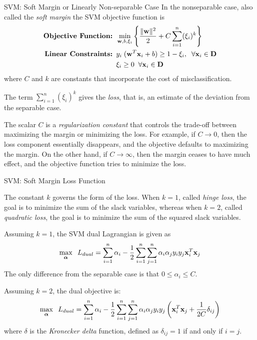 \begin{frame}{SVM: Soft Margin or Linearly Non-separable Case}
In the nonseparable case, also called the {\em soft margin}
the SVM objective function is
\begin{align*}
  \mbox{\bf Objective Function: } & \min_{\mathbf{w},b,\xi_i} \left\{ {\| \mathbf{w} \|^2 \over 2} + C
  \displaystyle \sum_{i=1}^n (\xi_i)^k \right \}\\
  \mbox{\bf Linear Constraints: } & y_i \; (\mathbf{w}^T\mathbf{x}_i + b) \ge 1 - \xi_i,\;\;
  \forall \mathbf{x}_i \in \mathbf{D}\\
  & \xi_i \ge 0 \; \; \forall \mathbf{x}_i \in \mathbf{D}
\end{align*}
where $C$
and $k$ are constants that incorporate the cost of
misclassif\/{i}cation.  

\medskip
The term $\sum_{i=1}^n (\xi_i)^k$ gives the
{\em loss}, that is, an estimate of the deviation from the
separable case. 

\medskip
The scalar $C$ is a {\em
regularization constant} that controls the trade-off between
maximizing the margin  or minimizing the loss.
For example, if $C \to 0$, then the loss component essentially
disappears, and the objective defaults to maximizing the margin.
On the other hand, if $C \to \infty$, then the margin ceases to
have much effect, and the objective function tries to minimize the
loss. 
\end{frame}


\begin{frame}{SVM: Soft Margin Loss Function}

The constant $k$ governs the form of the loss. When $k=1$, called {\em hinge loss}, the goal is
to minimize the sum of the slack variables, whereas when $k=2$,
called {\em quadratic loss}, the goal is to minimize the sum of
the squared slack variables.

Assuming $k=1$, the SVM dual Lagrangian is given as
\begin{align*}
     \max_{{\bm \alpha}}\;\;
     L_{dual} = \displaystyle \sum_{i=1}^n\alpha_{i} - {1 \over 2} \displaystyle \sum_{i=1}^n
  \displaystyle \sum_{j=1}^n \alpha_i\alpha_{j} y_i y_{j} \mathbf{x}_i^T\mathbf{x}_{j}
\end{align*}
The only difference from the separable case is that
$0 \le \alpha_i \le C$.

 Assuming $k=2$,
the dual objective is:
\begin{align*}
    \max_{{\bm \alpha}}\;\;
     L_{dual} = \displaystyle \sum_{i=1}^n\alpha_{i} - {1 \over 2} \displaystyle \sum_{i=1}^n
     \displaystyle \sum_{j=1}^n \alpha_i\alpha_{j} y_i y_{j} \left(\mathbf{x}_i^T\mathbf{x}_{j} +
     {1\over 2C}\delta_{ij} \right)
\end{align*}
where $\delta$ is the {\em Kronecker delta} function, def\/{i}ned as
$\delta_{ij} = 1$ if and only if $i=j$.

\end{frame}


